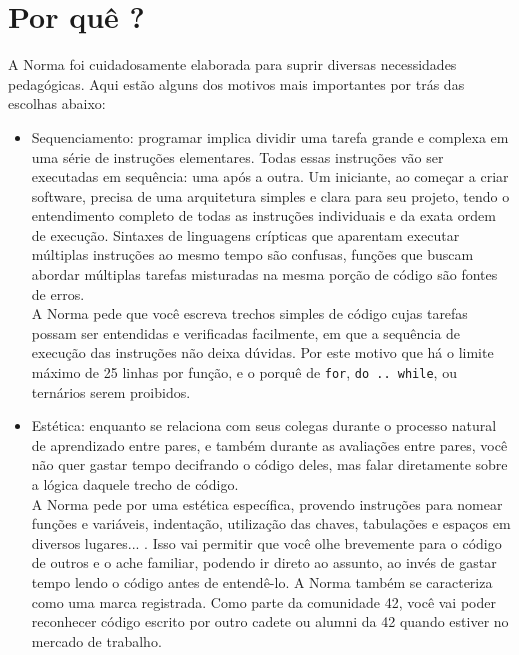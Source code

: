 \documentclass{42-pt}
\begin{document}
    \chapter{Por quê ?}

    A Norma foi cuidadosamente elaborada para suprir diversas necessidades
    pedagógicas. Aqui estão alguns dos motivos mais importantes por trás das
    escolhas abaixo:
    \begin{itemize}

	\item Sequenciamento: programar implica dividir uma tarefa grande e
	  complexa em uma série de instruções elementares. Todas essas instruções
	  vão ser executadas em sequência: uma após a outra. Um iniciante, ao
      começar a criar software, precisa de uma arquitetura simples e
	  clara para seu projeto, tendo o entendimento completo de todas as
      instruções individuais e da exata ordem de execução. Sintaxes de
      linguagens crípticas que aparentam executar múltiplas
	  instruções ao mesmo tempo são confusas, funções que buscam abordar
      múltiplas tarefas misturadas na mesma porção de código são fontes
      de erros. \\
	  A Norma pede que você escreva trechos simples de código cujas tarefas
	  possam ser entendidas e verificadas facilmente, em que a sequência de
      execução das instruções não deixa dúvidas. Por este motivo que há o
      limite máximo de 25 linhas por função, e o porquê de \texttt{for},
      \texttt{do .. while}, ou ternários serem proibidos.


    \item Estética: enquanto se relaciona com seus colegas durante o processo
      natural de aprendizado entre pares, e também durante as avaliações
      entre pares, você não quer gastar tempo decifrando o código deles,
      mas falar diretamente sobre a lógica daquele trecho de código.\\ A
      Norma pede por uma estética específica, provendo instruções para
      nomear funções e variáveis, indentação, utilização das chaves,
      tabulações e espaços em diversos lugares... . Isso vai permitir que
      você olhe brevemente para o código de outros e o ache familiar, podendo
      ir direto ao assunto, ao invés de gastar tempo lendo o código antes
      de entendê-lo. A Norma também se caracteriza como uma marca
      registrada. Como parte da comunidade 42, você vai poder reconhecer
      código escrito por outro cadete ou alumni da 42 quando estiver no
      mercado de trabalho.
    


\end{itemize}
\end{document}
